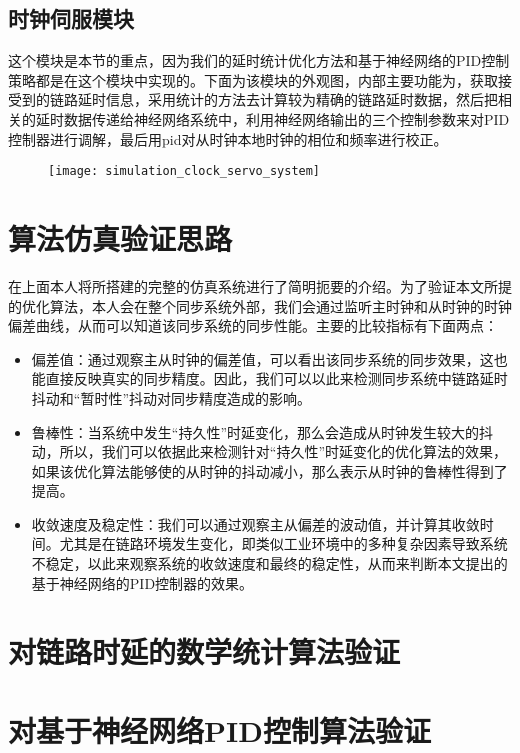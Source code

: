 \subsection{时钟伺服模块}
这个模块是本节的重点，因为我们的延时统计优化方法和基于神经网络的PID控制策略都是在这个模块中实现的。下面为该模块的外观图，内部主要功能为，获取接受到的链路延时信息，采用统计的方法去计算较为精确的链路延时数据，然后把相关的延时数据传递给神经网络系统中，利用神经网络输出的三个控制参数来对PID控制器进行调解，最后用pid对从时钟本地时钟的相位和频率进行校正。
\begin{figure}[!hbp]
  \centering
  \begin{minipage}[b]{1\textwidth}
    \captionstyle{\centering}
    \centering
    \texttt{[image: simulation\_clock\_servo\_system]}
  \end{minipage}     
\end{figure}

\section{算法仿真验证思路}
在上面本人将所搭建的完整的仿真系统进行了简明扼要的介绍。为了验证本文所提的优化算法，本人会在整个同步系统外部，我们会通过监听主时钟和从时钟的时钟偏差曲线，从而可以知道该同步系统的同步性能。主要的比较指标有下面两点：
\begin{itemize}[noitemsep,topsep=0pt,parsep=0pt,partopsep=0pt]
	\item 偏差值：通过观察主从时钟的偏差值，可以看出该同步系统的同步效果，这也能直接反映真实的同步精度。因此，我们可以以此来检测同步系统中链路延时抖动和“暂时性”抖动对同步精度造成的影响。
	\item 鲁棒性：当系统中发生“持久性”时延变化，那么会造成从时钟发生较大的抖动，所以，我们可以依据此来检测针对“持久性”时延变化的优化算法的效果，如果该优化算法能够使的从时钟的抖动减小，那么表示从时钟的鲁棒性得到了提高。
	\item 收敛速度及稳定性：我们可以通过观察主从偏差的波动值，并计算其收敛时间。尤其是在链路环境发生变化，即类似工业环境中的多种复杂因素导致系统不稳定，以此来观察系统的收敛速度和最终的稳定性，从而来判断本文提出的基于神经网络的PID控制器的效果。
\end{itemize}

\section{对链路时延的数学统计算法验证}

\section{对基于神经网络PID控制算法验证}
